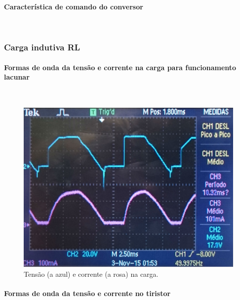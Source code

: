 \documentclass[a4paper,11pt]{article}
\numberwithin{equation}{section}
\begin{document}
\paragraph{Característica de comando do conversor} \mbox{}\

\subsubsection{Carga indutiva RL}

\paragraph{Formas de onda da tensão e corrente na carga para funcionamento lacunar} \mbox{}\

\begin{figure}[H]
	\centering
	\includegraphics[keepaspectratio=true, scale=0.15]{img/DSC_0184}
	\caption{Tensão (a azul) e corrente (a rosa) na carga.}
	\label{fig:tcentradalacuna}
	\vspace{-0.8em}
\end{figure}



\paragraph{Formas de onda da tensão e corrente no tiristor} \mbox{}\
\end{document}

